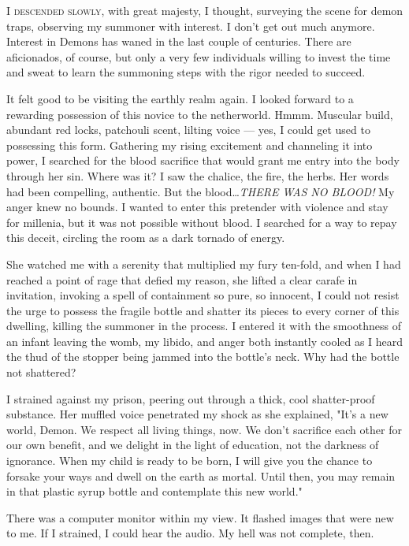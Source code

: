
\lettrine{I}{ descended slowly,} with great majesty, I thought, surveying the scene
for demon traps, observing my summoner with interest. I don't get out
much anymore. Interest in Demons has waned in the last couple of
centuries. There are aficionados, of course, but only a very few
individuals willing to invest the time and sweat to learn the summoning
steps with the rigor needed to succeed.

It felt good to be visiting the earthly realm again. I looked forward to
a rewarding possession of this novice to the netherworld. Hmmm. Muscular
build, abundant red locks, patchouli scent, lilting voice --- yes, I could
get used to possessing this form. Gathering my rising excitement and
channeling it into power, I searched for the blood sacrifice that would
grant me entry into the body through her sin. Where was it? I saw the
chalice, the fire, the herbs. Her words had been compelling, authentic.
But the blood\ldots \emph{THERE WAS NO BLOOD!} My anger knew no bounds. I
wanted to enter this pretender with violence and stay for millenia, but
it was not possible without blood. I searched for a way to repay this
deceit, circling the room as a dark tornado of energy.

She watched me with a serenity that multiplied my fury ten-fold, and
when I had reached a point of rage that defied my reason, she lifted a
clear carafe in invitation, invoking a spell of containment so pure, so
innocent, I could not resist the urge to possess the fragile bottle and
shatter its pieces to every corner of this dwelling, killing the
summoner in the process. I entered it with the smoothness of an infant
leaving the womb, my libido, and anger both instantly cooled as I heard
the thud of the stopper being jammed into the bottle's neck. Why had the
bottle not shattered?

I strained against my prison, peering out through a thick, cool
shatter-proof substance. Her muffled voice penetrated my shock as she
explained, "It's a new world, Demon. We respect all living things, now.
We don't sacrifice each other for our own benefit, and we delight in the
light of education, not the darkness of ignorance. When my child is
ready to be born, I will give you the chance to forsake your ways and
dwell on the earth as mortal. Until then, you may remain in that plastic
syrup bottle and contemplate this new world."

There was a computer monitor within my view. It flashed images that were
new to me. If I strained, I could hear the audio. My hell was not
complete, then.
